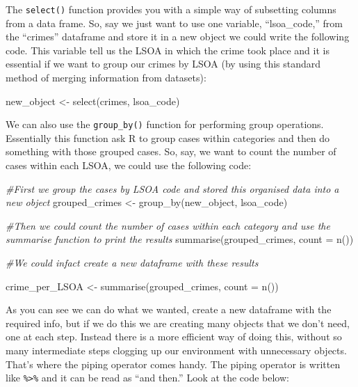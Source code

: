 \documentclass[
]{book}
\newenvironment{Shaded}{\begin{snugshade}}{\end{snugshade}}
\newcommand{\AttributeTok}[1]{\textcolor[rgb]{0.77,0.63,0.00}{#1}}
\newcommand{\CommentTok}[1]{\textcolor[rgb]{0.56,0.35,0.01}{\textit{#1}}}
\newcommand{\FunctionTok}[1]{\textcolor[rgb]{0.00,0.00,0.00}{#1}}
\newcommand{\NormalTok}[1]{#1}
\newcommand{\OtherTok}[1]{\textcolor[rgb]{0.56,0.35,0.01}{#1}}
\begin{document}
The \texttt{select()} function provides you with a simple way of subsetting columns from a data frame. So, say we just want to use one variable, ``lsoa\_code,'' from the ``crimes'' dataframe and store it in a new object we could write the following code. This variable tell us the LSOA in which the crime took place and it is essential if we want to group our crimes by LSOA (by using this standard method of merging information from datasets):

\begin{Shaded}
\begin{Highlighting}[]
\NormalTok{new\_object }\OtherTok{\textless{}{-}} \FunctionTok{select}\NormalTok{(crimes, lsoa\_code)}
\end{Highlighting}
\end{Shaded}

We can also use the \texttt{group\_by()} function for performing group operations. Essentially this function ask R to group cases within categories and then do something with those grouped cases. So, say, we want to count the number of cases within each LSOA, we could use the following code:

\begin{Shaded}
\begin{Highlighting}[]
\CommentTok{\#First we group the cases by LSOA code and stored this organised data into a new object}
\NormalTok{grouped\_crimes }\OtherTok{\textless{}{-}} \FunctionTok{group\_by}\NormalTok{(new\_object, lsoa\_code)}

\CommentTok{\#Then we could count the number of cases within each category and use the summarise function to print the results}
\FunctionTok{summarise}\NormalTok{(grouped\_crimes, }\AttributeTok{count =} \FunctionTok{n}\NormalTok{())}

\CommentTok{\#We could infact create a new dataframe with these results}

\NormalTok{crime\_per\_LSOA }\OtherTok{\textless{}{-}} \FunctionTok{summarise}\NormalTok{(grouped\_crimes, }\AttributeTok{count =} \FunctionTok{n}\NormalTok{())}
\end{Highlighting}
\end{Shaded}

As you can see we can do what we wanted, create a new dataframe with the required info, but if we do this we are creating many objects that we don't need, one at each step. Instead there is a more efficient way of doing this, without so many intermediate steps clogging up our environment with unnecessary objects. That's where the piping operator comes handy. The piping operator is written like \texttt{\%\textgreater{}\%} and it can be read as ``and then.'' Look at the code below:
\end{document}
